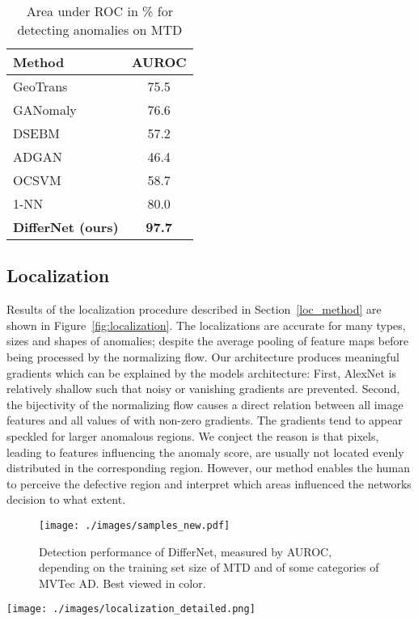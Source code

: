 \documentclass[10pt,twocolumn,letterpaper]{article}
\begin{document}
\begin{table}
\begin{center}
\begin{tabular}{|l|c|}
\hline
Method & AUROC  \\
\hline
GeoTrans\cite{geotrans} & 75.5 \\
GANomaly\cite{ganomaly} & 76.6 \\
DSEBM \cite{dsebm} & 57.2 \\
ADGAN \cite{ADGAN} & 46.4 \\
OCSVM \cite{andrews} & 58.7 \\
1-NN \cite{nazare} & 80.0 \\
\textbf{DifferNet (ours)} & \textbf{97.7} \\
\hline
\end{tabular}
\end{center}
\caption{Area under ROC in \% for detecting anomalies on MTD}
\label{table:magnets}
\end{table}

\subsection{Localization}
Results of the localization procedure described in Section~\ref{loc_method} are shown in Figure~\ref{fig:localization}.
The localizations are accurate for many types, sizes and shapes of anomalies; despite the average pooling of feature maps before being processed by the normalizing flow.
Our architecture produces meaningful gradients which can be explained by the models architecture:
First, AlexNet is relatively shallow such that noisy or vanishing gradients are prevented.
Second, the bijectivity of the normalizing flow causes a direct relation between all image features  and all values of  with non-zero gradients.
The gradients tend to appear speckled for larger anomalous regions.
We conject the reason is that pixels, leading to features influencing the anomaly score, are usually not located evenly distributed in the corresponding region.
However, our method enables the human to perceive the defective region and interpret which areas influenced the networks decision to what extent.

\begin{figure}
\centering
  \texttt{[image: ./images/samples\_new.pdf]} 
 \caption{Detection performance of DifferNet, measured by AUROC, depending on the training set size of MTD and of some categories of MVTec AD. Best viewed in color.
}
\label{fig:samples}
\end{figure}
\begin{figure*}
\centering
  \texttt{[image: ./images/localization\_detailed.png]} \caption{Localization of anomalous regions of different categories in MVTec AD. The upper rows shows the original anomaly images, the mid rows the localizations provided by DifferNet and the lower rows the superimposition of both. They were generated by backpropagating the negative log-likelihood loss to the input image.}
\label{fig:localization}
\end{figure*}
\end{document}
